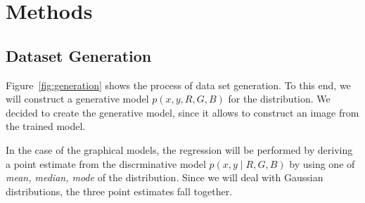 \documentclass{article}
\begin{document}
\section{Methods}
\label{sec:methods}

\subsection{Dataset Generation}

Figure~\ref{fig:generation} shows the process of data set
generation. To this end, we will construct a generative model
$p(x,y,R,G,B)$ for the distribution. We decided to create the
generative model, since it allows to construct an image from the
trained model.

In the case of the graphical models, the regression will be performed
by deriving a point estimate from the discrminative model $p(x,y \mid
R,G,B)$ by using one of \emph{mean, median, mode} of the
distribution. Since we will deal with Gaussian distributions, the
three point estimates fall together.
\end{document}
